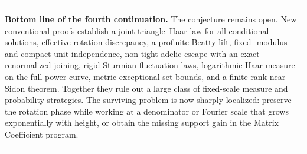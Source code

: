 \documentclass[11pt,oneside]{article}
\theoremstyle{definition}
\theoremstyle{remark}
\newenvironment{resultbox}
{\begin{center}\begin{minipage}{0.94\textwidth}\hrule\vspace{0.45em}}
{\vspace{0.35em}\hrule\end{minipage}\end{center}}
\begin{document}
\begin{resultbox}
\textbf{Bottom line of the fourth continuation.}
The conjecture remains open.  New conventional proofs establish a joint triangle--Haar law for
all conditional solutions, effective rotation discrepancy, a profinite Beatty lift, fixed-
modulus and compact-unit independence, non-tight adelic escape with an exact renormalized
joining, rigid Sturmian fluctuation laws, logarithmic Haar measure on the full power curve,
metric exceptional-set bounds, and a finite-rank near-Sidon theorem.  Together they rule out a
large class of fixed-scale measure and probability strategies.  The surviving problem is now
sharply localized: preserve the rotation phase while working at a denominator or Fourier scale
that grows exponentially with height, or obtain the missing support gain in the Matrix
Coefficient program.
\end{resultbox}
\end{document}
